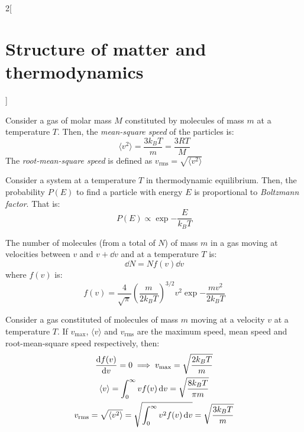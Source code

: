 \documentclass[../../../main_physics.tex]{subfiles}
\begin{document}
\begin{multicols}{2}[\section{Structure of matter and thermodynamics}]
\begin{proposition}
  \end{proposition}
  \begin{proposition}
    Consider a gas of molar mass $M$ constituted by molecules of mass $m$ at a temperature $T$. Then, the \emph{mean-square speed} of the particles is: $$\langle v^2\rangle=\frac{3 k_B T}{m}=\frac{3 R T}{M}$$
    The \emph{root-mean-square speed} is defined as $v_\text{rms}=\sqrt{\langle v^2\rangle}$
  \end{proposition}
  \begin{proposition}
    Consider a system at a temperature $T$ in thermodynamic equilibrium. Then, the probability $P(E)$ to find a particle with energy $E$ is proportional to \emph{Boltzmann factor}. That is:
    $$P(E)\propto\exp{-\frac{E}{k_BT}}$$
  \end{proposition}
  \begin{proposition}
    The number of molecules (from a total of $N$) of mass $m$ in a gas moving at velocities between $v$ and $v+\dd{v}$ and at a temperature $T$ is:
    $$\dd{N}=Nf(v)\dd{v}$$ where $f(v)$ is: $$f(v)=\frac{4}{\sqrt{\pi}}{\left(\frac{m}{2k_BT}\right)}^{3/2}v^2\exp{-\frac{mv^2}{2k_BT}}$$
  \end{proposition}
  \begin{proposition}
    Consider a gas constituted of molecules of mass $m$ moving at a velocity $v$ at a temperature $T$. If $v_\text{max}$, $\langle v\rangle$ and $v_\text{rms}$ are the maximum speed, mean speed and root-mean-square speed respectively, then:
    \begin{gather*}
      \dv{f(v)}{v}=0\implies v_\text{max}=\sqrt{\frac{2k_BT}{m}}\\
      \langle v\rangle=\int_0^\infty vf(v)\dd{v}=\sqrt{\frac{8k_BT}{\pi m}}\\
      v_\text{rms}=\sqrt{\langle v^2\rangle}=\sqrt{\int_0^\infty v^2f(v)\dd{v}}=\sqrt{\frac{3k_BT}{m}}
    \end{gather*}
  \end{proposition}

\end{multicols}
\end{document}
